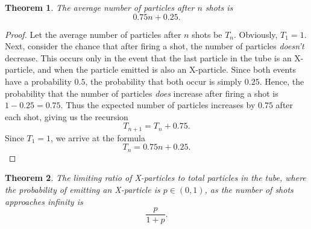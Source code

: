 \documentclass{article}
\newtheorem{theorem}{Theorem}
\begin{document}
\begin{theorem}\label{thm:2}
  The average number of particles after $n$ shots is \[
  0.75n + 0.25
  .\]
\end{theorem}
\begin{proof}
  Let the average number of particles after $n$ shots be $T_n$. Obviously, $T_1 = 1$. Next, consider the chance that after firing a shot, the number of particles \emph{doesn't} decrease. This occurs only in the event that the last particle in the tube is an X-particle, and when the particle emitted is also an X-particle. Since both events have a probability $0.5$, the probability that both occur is simply $0.25$. Hence, the probability that the number of particles \emph{does} increase after firing a shot is $1 - 0.25 = 0.75$. Thus the expected number of particles increases by $0.75$ after each shot, giving us the recursion \[
    T_{n+1} = T_{n} + 0.75
  .\] Since $T_1 = 1$, we arrive at the formula \[
    T_{n} = 0.75n + 0.25 \tag*{\qedhere}
  .\] 
\end{proof}
\begin{theorem}
  The limiting ratio of X-particles to total particles in the tube, where the probability of emitting an X-particle is $p \in (0, 1)$, as the number of shots approaches infinity is \[
  \frac{p}{1+p}
  .\]
\end{theorem}
\end{document}
